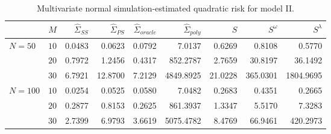 \begin{table}[H]
\centering
\caption{Multivariate normal simulation-estimated quadratic risk  for model II.} 
\begin{tabular}{lrrrrrrrr}
& $M$ &$\hat{\Sigma}_{SS}$& $\hat{\Sigma}_{PS}$ &$\hat{\Sigma}_{oracle}$& $\hat{\Sigma}_{poly}$ & $S$ &$S^\omega$& $S^\lambda$ \\ 
  \hline
$N = 50$ & $10$ & 0.0483 & 0.0623 & 0.0792 & 7.0137 & 0.6269 & 0.8108 & 0.5770 \\ 
    & $20$ & 0.7972 & 1.2456 & 0.4317 & 852.2787 & 2.7659 & 30.8197 & 36.1492 \\ 
     & $30$ & 6.7921 & 12.8700 & 7.2129 & 4849.8925 & 21.0228 & 365.0301 & 1804.9695 \\ 
     $N = 100$ & $10$ & 0.0254 & 0.0525 & 0.0580 & 7.0482 & 0.2683 & 0.4351 & 0.2665 \\ 
    & $20$ & 0.2877 & 0.8153 & 0.2625 & 861.3937 & 1.3347 & 5.5170 & 7.3283 \\ 
     & $30$ & 2.7399 & 6.9793 & 3.6619 & 5075.4782 & 8.4769 & 66.9461 & 420.2973 \\ 

   \hline
\end{tabular}
\label{table:simulation-1-quad-loss-sigma-2}
\end{table}
 
